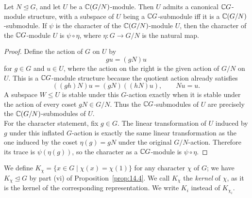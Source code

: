 \documentclass[../Odyssey_Project.tex]{subfiles}
\begin{document}
\begin{lemma}
\label{lem:15.6}
Let $N \trianglelefteq G$, and let $U$ be a $\mathbb{C}(G/N)$-module. Then $U$ admits a canonical $\mathbb{C} G$-module structure, with a subspace of $U$ being a $\mathbb{C} G$-submodule iff it is a $\mathbb{C}(G/N)$-submodule. If $\psi$ is the character of the $\mathbb{C}(G/N)$-module $U$, then the character of the $\mathbb{C} G$-module $U$ is $\psi \circ \eta$, where $\eta\colon G \to G/N$ is the natural map.
\end{lemma}
\begin{proof}
    Define the action of $G$ on $U$ by
    \[
        gu=(gN)u
    \]
    for $g\in G$ and $u\in U$, where the action on the right is the given action of $G/N$ on $U$. This is a $\mathbb{C} G$-module structure because the quotient action already satisfies
    \[
        ((gh)N)u=(gN)((hN)u),
        \qquad
        N u=u.
    \]
    A subspace $W\leq U$ is stable under this $G$-action exactly when it is stable under the action of every coset $gN\in G/N$. Thus the $\mathbb{C} G$-submodules of $U$ are precisely the $\mathbb{C}(G/N)$-submodules of $U$.\\
    For the character statement, fix $g\in G$. The linear transformation of $U$ induced by $g$ under this inflated $G$-action is exactly the same linear transformation as the one induced by the coset $\eta(g)=gN$ under the original $G/N$-action. Therefore its trace is $\psi(\eta(g))$, so the character as a $\mathbb{C} G$-module is $\psi\circ\eta$.
\end{proof}

We define $K_\chi = \{x \in G \mid \chi(x) = \chi(1)\}$ for any character $\chi$ of $G$; we have $K_\chi \trianglelefteq G$ by part (vi) of Proposition~\ref{prop:14.4}. We call $K_\chi$ the \emph{kernel} of $\chi$, as it is the kernel of the corresponding representation. We write $K_i$ instead of $K_{\chi_i}$.
\end{document}
